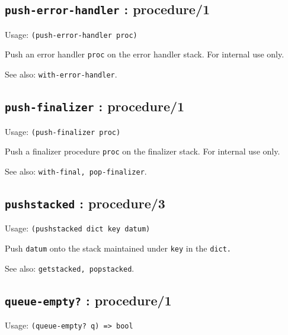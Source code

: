 \documentclass[
]{article}
\newcommand{\passthrough}[1]{#1}
\begin{document}
\hypertarget{push-error-handler-procedure1-1}{%
\subsection{\texorpdfstring{\texttt{push-error-handler} :
procedure/1}{push-error-handler : procedure/1}}\label{push-error-handler-procedure1-1}}

Usage: \passthrough{\lstinline!(push-error-handler proc)!}

Push an error handler \passthrough{\lstinline!proc!} on the error
handler stack. For internal use only.

See also: \passthrough{\lstinline!with-error-handler!}.

\hypertarget{push-finalizer-procedure1-1}{%
\subsection{\texorpdfstring{\texttt{push-finalizer} :
procedure/1}{push-finalizer : procedure/1}}\label{push-finalizer-procedure1-1}}

Usage: \passthrough{\lstinline!(push-finalizer proc)!}

Push a finalizer procedure \passthrough{\lstinline!proc!} on the
finalizer stack. For internal use only.

See also: \passthrough{\lstinline!with-final, pop-finalizer!}.

\hypertarget{pushstacked-procedure3-1}{%
\subsection{\texorpdfstring{\texttt{pushstacked} :
procedure/3}{pushstacked : procedure/3}}\label{pushstacked-procedure3-1}}

Usage: \passthrough{\lstinline!(pushstacked dict key datum)!}

Push \passthrough{\lstinline!datum!} onto the stack maintained under
\passthrough{\lstinline!key!} in the \passthrough{\lstinline!dict.!}

See also: \passthrough{\lstinline!getstacked, popstacked!}.

\hypertarget{queue-empty-procedure1-1}{%
\subsection{\texorpdfstring{\texttt{queue-empty?} :
procedure/1}{queue-empty? : procedure/1}}\label{queue-empty-procedure1-1}}

Usage: \passthrough{\lstinline!(queue-empty? q) => bool!}
\end{document}
